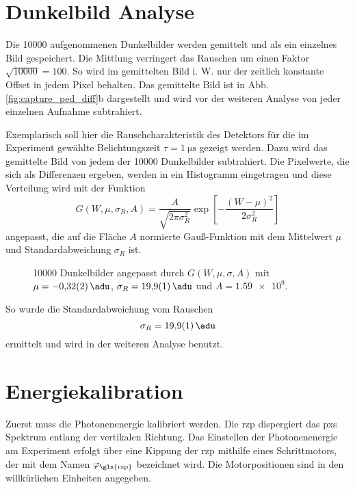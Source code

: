\section{Dunkelbild Analyse}
Die \num{10000} aufgenommenen Dunkelbilder werden gemittelt und als ein einzelnes Bild gespeichert. Die Mittlung verringert das Rauschen um einen Faktor $\sqrt{10000} = 100$. So wird im gemittelten Bild i. W. nur der zeitlich konstante Offset in jedem Pixel behalten. Das gemittelte Bild ist in Abb. \ref{fig:capture_ped_diff}b dargestellt und wird vor der weiteren Analyse von jeder einzelnen Aufnahme subtrahiert.

\noindent
Exemplarisch soll hier die Rauschcharakteristik des Detektors für die im Experiment gewählte Belichtungszeit $\tau = \SI{1}{\micro\second}$ gezeigt werden. Dazu wird das gemittelte Bild von jedem der \num{10000} Dunkelbilder subtrahiert. Die Pixelwerte, die sich als Differenzen ergeben, werden in ein Histogramm eingetragen und diese Verteilung wird mit der Funktion
\begin{equation}
    G(W, \mu, \sigma_R, A) = \frac{A}{\sqrt{2\pi \sigma_R^2}}\exp\left[-\frac{(W - \mu)^2}{2\sigma_R^2}\right]
    \label{eq:gauss_funktion}
\end{equation}
angepasst, die auf die Fläche $A$ normierte Gauß-Funktion mit dem Mittelwert $\mu$ und Standardabweichung $\sigma_R$ ist.
\begin{figure}[H]
    \centering
    
    \caption{\num{10000} Dunkelbilder angepasst durch $G(W,\mu,\sigma, A)$ mit $\mu= \SI{-0.32(2)}{\adu}$, $\sigma_R = \SI{19.9(1)}{\adu}$ und $A = \num{1.59e9}$.}
    \label{fig:noise_hist_fit}
\end{figure}
\noindent
So wurde die Standardabweichung vom Rauschen
\begin{equation}
    \sigma_R = \SI{19.9(1)}{\adu}
    \label{eq:sigma_r}
\end{equation}
ermittelt und wird in der weiteren Analyse benutzt.

\section{Energiekalibration}
Zuerst muss die Photonenenergie kalibriert werden. Die \gls{rzp} dispergiert das \gls{pxs} Spektrum entlang der vertikalen Richtung. Das Einstellen der Photonenenergie am Experiment erfolgt über eine Kippung der \gls{rzp} mithilfe eines Schrittmotors, der mit dem Namen $\varphi_\text{\gls{rzp}}$ bezeichnet wird. Die Motorpositionen sind in den willkürlichen Einheiten angegeben.

